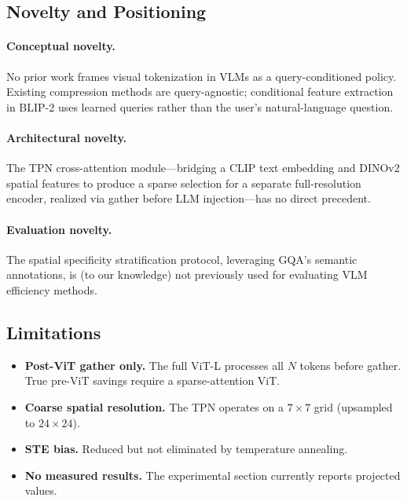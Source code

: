 \documentclass[11pt,a4paper]{article}
\begin{document}
\subsection{Novelty and Positioning}

\paragraph{Conceptual novelty.}
No prior work frames visual tokenization in VLMs as a query-conditioned
policy.
Existing compression methods are query-agnostic; conditional feature
extraction in BLIP-2 uses learned queries rather than the user's
natural-language question.

\paragraph{Architectural novelty.}
The TPN cross-attention module---bridging a CLIP text embedding and DINOv2
spatial features to produce a sparse selection for a separate full-resolution
encoder, realized via gather before LLM injection---has no direct precedent.

\paragraph{Evaluation novelty.}
The spatial specificity stratification protocol, leveraging GQA's semantic
annotations, is (to our knowledge) not previously used for evaluating VLM
efficiency methods.

\subsection{Limitations}

\begin{itemize}[leftmargin=1.5em, itemsep=2pt]
  \item \textbf{Post-ViT gather only.}
    The full ViT-L processes all $N$ tokens before gather.
    True pre-ViT savings require a sparse-attention ViT.
  \item \textbf{Coarse spatial resolution.}
    The TPN operates on a $7{\times}7$ grid (upsampled to $24{\times}24$).
  \item \textbf{STE bias.}
    Reduced but not eliminated by temperature annealing.
  \item \textbf{No measured results.}
    The experimental section currently reports projected values.
\end{itemize}
\end{document}
